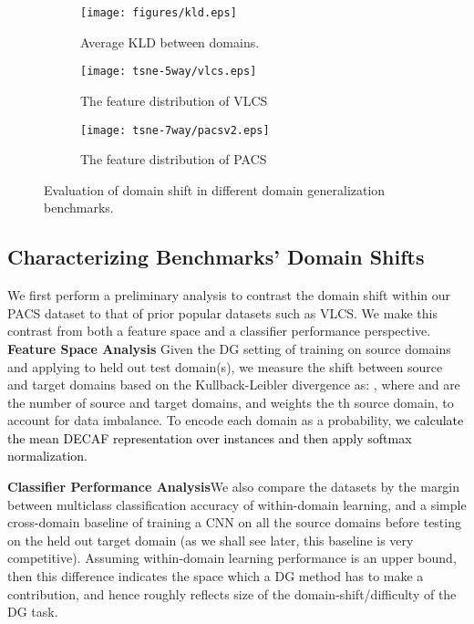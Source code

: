 \documentclass[10pt,twocolumn,letterpaper]{article}
\begin{document}
\begin{figure*}[t]
\centering
\begin{subfigure}{0.14\textwidth}
\centering
\vspace{1cm}
\texttt{[image: figures/kld.eps]}
\caption{Average KLD between domains.}
\end{subfigure}
\hspace{0.6cm}
\begin{subfigure}{0.32\textwidth}
\centering
\texttt{[image: tsne-5way/vlcs.eps]}
\caption{The feature distribution of VLCS}
\end{subfigure}
\hspace{-0.2cm}
\begin{subfigure}{0.32\textwidth}
\centering
\texttt{[image: tsne-7way/pacsv2.eps]}
\caption{The feature distribution of PACS}
\end{subfigure}
\caption{Evaluation of domain shift in different domain generalization benchmarks.}\label{fig:domain-bias}
\end{figure*}

\subsection{Characterizing Benchmarks' Domain  Shifts}\label{sub:datasetAnalysis}
We first perform a preliminary analysis to contrast the domain shift within our PACS dataset to that of prior popular datasets such as VLCS. We make this contrast from both a feature space and a classifier performance perspective.\\
\noindent\textbf{Feature Space Analysis}\quad
Given the DG setting of training on source domains and applying to held out test domain(s), we measure the shift between source and target domains based on the Kullback-Leibler divergence as: ,
where  and  are the number of source and target domains, and  weights the  th source domain, to account for data imbalance. To encode each domain as a probability, \textcolor{black}{we calculate the mean DECAF representation over instances and then apply softmax normalization}. 

\vspace{0.1cm}\noindent\textbf{Classifier Performance Analysis}\quad We also compare the datasets by the margin between multiclass classification accuracy of within-domain learning, and a simple cross-domain baseline of training a CNN on all the source domains before testing on the held out target domain (as we shall see later, this baseline is very competitive). Assuming within-domain learning performance is an upper bound, then this difference indicates the space which a DG method has to make a contribution, and hence roughly reflects size of the domain-shift/difficulty of the DG task. 
\end{document}
